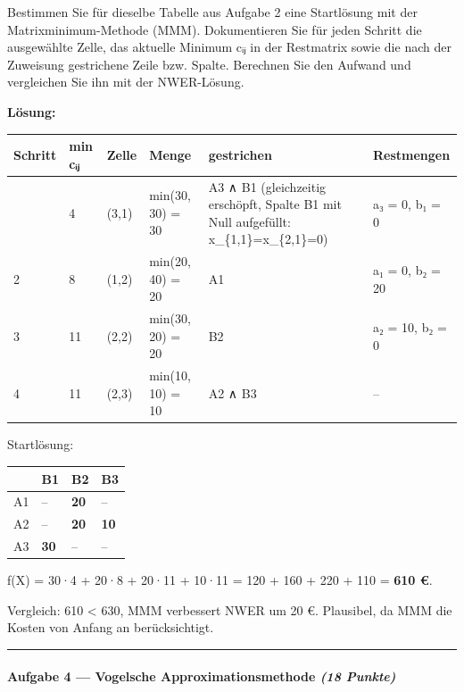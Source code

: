 \documentclass[11pt, a4paper]{article}
\begin{document}
Bestimmen Sie für dieselbe Tabelle aus Aufgabe 2 eine Startlösung mit der Matrixminimum-Methode (MMM). Dokumentieren Sie für jeden Schritt die ausgewählte Zelle, das aktuelle Minimum cᵢⱼ in der Restmatrix sowie die nach der Zuweisung gestrichene Zeile bzw. Spalte. Berechnen Sie den Aufwand und vergleichen Sie ihn mit der NWER-Lösung.


\textbf{Lösung:}



{\small
\begin{tabularx}{\linewidth}{XXXXXX}
\hline
\rowcolor{tableheadbg}
{\color{white}\textbf{Schritt}} & {\color{white}\textbf{min cᵢⱼ}} & {\color{white}\textbf{Zelle}} & {\color{white}\textbf{Menge}} & {\color{white}\textbf{gestrichen}} & {\color{white}\textbf{Restmengen}} \\[2pt]
\hline
\endhead
\hline
\endfoot
1 & 4 & (3,1) & min(30, 30) = 30 & A3 ∧ B1 (gleichzeitig erschöpft, Spalte B1 mit Null aufgefüllt: x\_\{1,1\}=x\_\{2,1\}=0) & a₃ = 0, b₁ = 0 \\
2 & 8 & (1,2) & min(20, 40) = 20 & A1 & a₁ = 0, b₂ = 20 \\
3 & 11 & (2,2) & min(30, 20) = 20 & B2 & a₂ = 10, b₂ = 0 \\
4 & 11 & (2,3) & min(10, 10) = 10 & A2 ∧ B3 & – \\
\end{tabularx}
}


Startlösung:



{\small
\begin{tabularx}{\linewidth}{XXXX}
\hline
\rowcolor{tableheadbg}
{\color{white}\textbf{}} & {\color{white}\textbf{B1}} & {\color{white}\textbf{B2}} & {\color{white}\textbf{B3}} \\[2pt]
\hline
\endhead
\hline
\endfoot
A1 & – & \textbf{20} & – \\
A2 & – & \textbf{20} & \textbf{10} \\
A3 & \textbf{30} & – & – \\
\end{tabularx}
}


f(X) = 30·4 + 20·8 + 20·11 + 10·11 = 120 + 160 + 220 + 110 = \textbf{610 €}.


Vergleich: 610 < 630, MMM verbessert NWER um 20 €. Plausibel, da MMM die Kosten von Anfang an berücksichtigt.



\noindent\textcolor{rulegray}{\rule{\linewidth}{0.4pt}}


\paragraph{Aufgabe 4 — Vogelsche Approximationsmethode \textit{(18 Punkte)}}\mbox{}\\[2pt]
\end{document}

